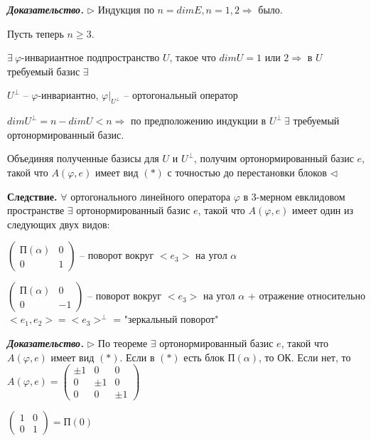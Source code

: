 \vspace{\baselineskip}
\textbf{\textit{Доказательство.}} $\rhd$ Индукция по $n = dimE, n=1, 2 \Rightarrow$ было.

Пусть теперь $n \geqslant 3$.

$\exists \ \varphi$-инвариантное подпространство $U$, такое что $dimU = 1$ или $2 \Rightarrow$ в $U$ требуемый базис $\exists$

$U^{\bot}$ -- $\varphi$-инвариантно, $\varphi|_{U^{\bot}}$ -- ортогональный оператор

$dimU^{\bot} = n - dimU < n \Rightarrow$ по предположению индукции в $U^{\bot} \ \exists$ требуемый ортонормированный базис.

Объединяя полученные базисы для $U$ и $U^{\bot}$, получим ортонормированный базис $e$, такой что $A(\varphi, e)$ имеет вид $(*)$ с точностью до перестановки блоков $\lhd$

\vspace{\baselineskip}
\textbf{Следствие.} $\forall$ ортогонального линейного оператора $\varphi$ в 3-мерном евклидовом пространстве $\exists$ ортонормированный базис $e$, такой что $A(\varphi, e)$ имеет один из следующих двух видов:

 $\begin{pmatrix} П(\alpha) & 0 \\ 0 & 1 \end{pmatrix}$ -- поворот вокруг $<e_3>$ на угол $\alpha$

 $\begin{pmatrix} П(\alpha) & 0 \\ 0 & -1 \end{pmatrix}$ -- поворот вокруг $<e_3>$ на угол $\alpha$ + отражение относительно $<e_1, e_2> = <e_3>^{\bot}$ = "зеркальный поворот"

\vspace{\baselineskip}
\textbf{\textit{Доказательство.}} $\rhd$ По теореме $\exists$ ортонормированный базис $e$, такой что $A(\varphi, e)$ имеет вид $(*)$. Если в $(*)$ есть блок $П(\alpha)$, то ОК. Если нет, то $A(\varphi, e) = \begin{pmatrix} \pm 1 & 0 & 0 \\ 0 & \pm 1 & 0 \\ 0 & 0 & \pm 1 \end{pmatrix}$

$\begin{pmatrix} 1 & 0 \\ 0 & 1 \end{pmatrix} = П(0)$

